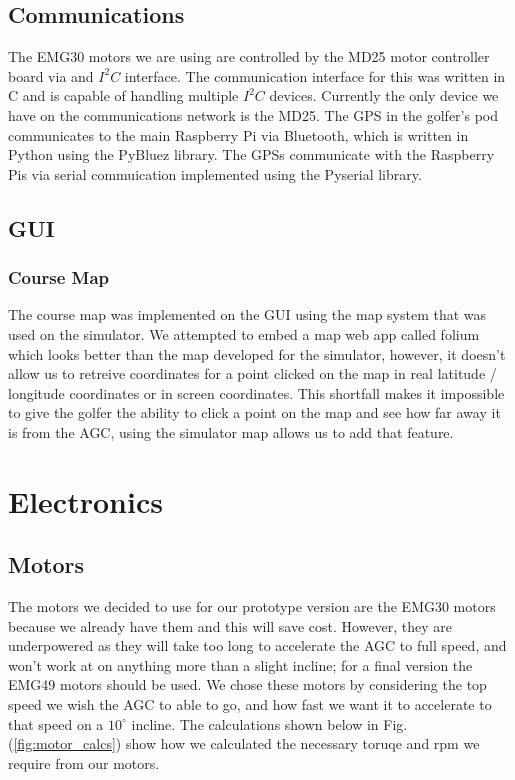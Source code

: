 \documentclass[11pt,landscape]{article}
\begin{document}
\begin{multicols}{3}

\subsection{Communications}
The EMG30 motors we are using are controlled by the MD25 motor controller board
via and $I^2C$ interface. The communication interface for this was written in C
and is capable of handling multiple $I^2C$ devices. Currently the only device we
have on the communications network is the MD25. The GPS in the golfer's pod communicates to the main Raspberry Pi via Bluetooth,
which is written in Python using the PyBluez library. The GPSs communicate with
the Raspberry Pis via serial commuication implemented using the Pyserial
library.

\subsection{GUI}
\subsubsection{Course Map}
The course map was implemented on the GUI using the map system that was used on
the simulator. We attempted to embed a map web app called folium which looks
better than the map developed for the simulator, however, it doesn't allow us to
retreive coordinates for a point clicked on the map in real latitude / longitude
coordinates or in screen coordinates. This shortfall makes it impossible to give
the golfer the ability to click a point on the map and see how far away it is
from the AGC, using the simulator map allows us to add that feature.



\section{Electronics}
\label{electronics}
\subsection{Motors}
The motors we decided to use for our prototype version are the EMG30 motors
because we already have them and this will save cost. However, they are
underpowered as they will take too long to accelerate the AGC to full speed, and
won't work at on anything more than a slight incline; for a final version the
EMG49 motors should be used. 
We chose these motors
by
considering the top speed we wish the AGC to able to go, and how fast we want it
to accelerate to that speed on a $10^\circ$ incline. The calculations shown below in
Fig. (\ref{fig:motor_calcs}) show how we calculated the necessary toruqe and rpm we require from our
motors.


\end{multicols}
\end{document}

